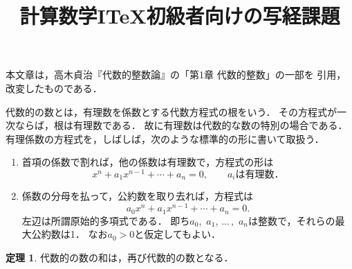 \documentclass[uplatex]{jsarticle}
\title{計算数学I\quad \TeX 初級者向けの写経課題}
\theoremstyle{definition}
\newtheorem*{thm}{定理}
\begin{document}
\maketitle

本文章は，高木貞治『代数的整数論』の「第1章 代数的整数」の一部を
引用，改変したものである．

\bigskip

代数的の数とは，有理数を係数とする代数方程式の根をいう．
その方程式が一次ならば，根は有理数である．
故に有理数は代数的な数の特別の場合である．
有理係数の方程式を，しばしば，次のような標準的の形に書いて取扱う．

\begin{enumerate}
\renewcommand{\labelenumi}{(\arabic{enumi}${}^\circ$)}
\item 首項の係数で割れば，他の係数は有理数で，方程式の形は
  \[
    x^n+a_1x^{n-1}+\cdots+a_n=0,\qquad \text{$a_i$は有理数．}
  \]
\item 係数の分母を払って，公約数を取り去れば，方程式は
  \[
    a_0x^n+a_1x^{n-1}+\cdots+a_n=0.
  \]
  左辺は所謂原始的多項式である．
  即ち$a_0$,~$a_1$, $\ldots\,$,~$a_n$は整数で，それらの最大公約数は1．
  なお$a_0>0$と仮定してもよい．
\end{enumerate}

\begin{thm}
代数的の数の和は，再び代数的の数となる．
\end{thm}
\end{document}
